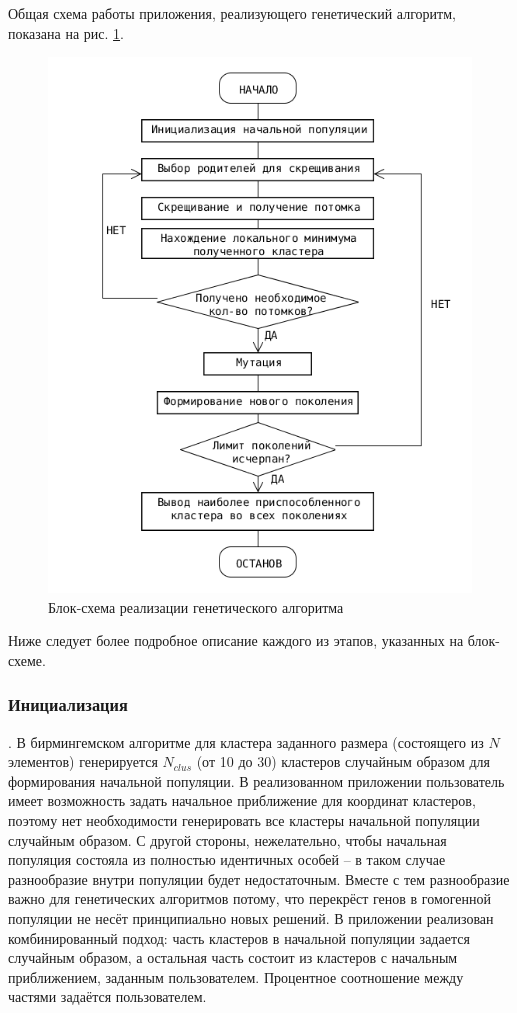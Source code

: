 Общая схема работы приложения, реализующего генетический алгоритм, показана на
рис. \ref{block_gen}.

\begin{figure}[ht!]
 \begin{center}
 \includegraphics[height=0.65\textheight]{FIGs/gen_alg_block.png}
 \end{center}
 \caption {Блок-схема реализации генетического алгоритма}
 \label{block_gen} 
\end{figure}

Ниже следует более подробное описание каждого из этапов, указанных на блок-схеме.

\subsubsection {Инициализация}.
В бирмингемском алгоритме для кластера заданного размера (состоящего из $N$ элементов)
генерируется $N_{clus}$ (от 10 до 30) кластеров случайным образом для формирования начальной
популяции. В реализованном приложении пользователь имеет возможность задать начальное
приближение для координат кластеров, поэтому нет необходимости генерировать все
кластеры начальной популяции случайным образом. С другой стороны, нежелательно, чтобы
начальная популяция состояла из полностью идентичных особей -- в таком случае разнообразие
внутри популяции будет недостаточным. Вместе с тем разнообразие важно для генетических алгоритмов
потому, что перекрёст генов в гомогенной популяции не несёт принципиально новых решений. В приложении
реализован комбинированный подход: часть кластеров в начальной популяции задается
случайным образом, а остальная часть состоит из кластеров с начальным приближением,
заданным пользователем. Процентное соотношение между частями задаётся пользователем.


